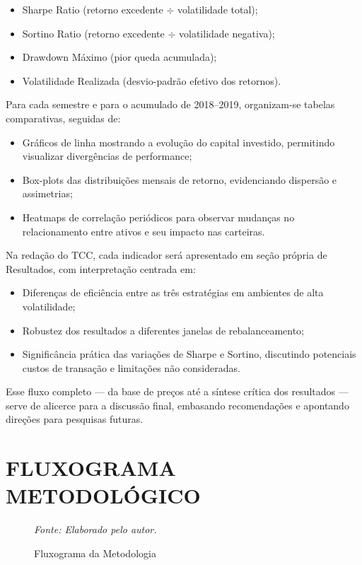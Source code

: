 \begin{itemize}
    \item Sharpe Ratio (retorno excedente $\div$ volatilidade total);
    \item Sortino Ratio (retorno excedente $\div$ volatilidade negativa);
    \item Drawdown Máximo (pior queda acumulada);
    \item Volatilidade Realizada (desvio-padrão efetivo dos retornos).
\end{itemize}

Para cada semestre e para o acumulado de 2018--2019, organizam-se tabelas comparativas, seguidas de:

\begin{itemize}
    \item Gráficos de linha mostrando a evolução do capital investido, permitindo visualizar divergências de performance;
    \item Box-plots das distribuições mensais de retorno, evidenciando dispersão e assimetrias;
    \item Heatmaps de correlação periódicos para observar mudanças no relacionamento entre ativos e seu impacto nas carteiras.
\end{itemize}

Na redação do TCC, cada indicador será apresentado em seção própria de Resultados, com interpretação centrada em:

\begin{itemize}
    \item Diferenças de eficiência entre as três estratégias em ambientes de alta volatilidade;
    \item Robustez dos resultados a diferentes janelas de rebalanceamento;
    \item Significância prática das variações de Sharpe e Sortino, discutindo potenciais custos de transação e limitações não consideradas.
\end{itemize}

Esse fluxo completo --- da base de preços até a síntese crítica dos resultados --- serve de alicerce para a discussão final, embasando recomendações e apontando direções para pesquisas futuras.

\section{FLUXOGRAMA METODOLÓGICO}

\begin{figure}[h]
\centering
\caption{Fluxograma da Metodologia}
\textit{Fonte: Elaborado pelo autor.}
\label{fig:fluxograma_metodologia}
\end{figure}

